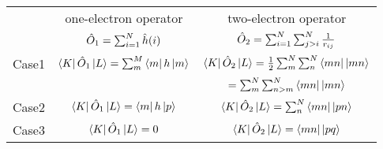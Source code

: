 \documentclass[11pt]{article}
\begin{document}
\begin{longtable}{ccc}
\toprule[2pt]
&one-electron operator & two-electron operator\\
&$\Hat{O}_1=\sum_{i=1}^{N}\Hat{h} (i)$ & $\Hat{O}_2=\sum_{i=1}^{N}\sum_{j>i}^{N}\frac{1}{r_{ij}}$\\
\midrule[1pt]
Case1 & $\bra{K}\Hat{O}_1\ket{L}=\sum_{m}^{M}\bra{m}h\ket{m}$ & $\bra{K}\Hat{O}_2\ket{L}=\frac{1}{2}\sum_{m}^{N}\sum_{n}^{N}\bra{mn}\ket{mn}  $\\
& & $=\sum_{m}^{N}\sum_{n>m}^{N}\bra{mn}\ket{mn}$\\
Case2 & $\bra{K}\Hat{O}_1\ket{L}=\bra{m}h\ket{p}$ & $\bra{K}\Hat{O}_2\ket{L}=\sum_{n}^{N}\bra{mn}\ket{pn}$\\
Case3 & $\bra{K}\Hat{O}_1\ket{L}=0$ & $\bra{K}\Hat{O}_2\ket{L}=\bra{mn}\ket{pq}$\\
\bottomrule[2pt]
\end{longtable}
\end{document}
